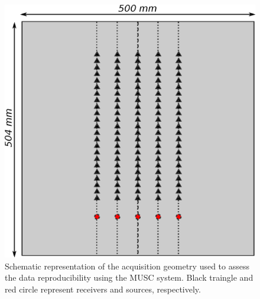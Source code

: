 \documentclass[manuscript,revised]{geophysics}
\begin{document}
\begin{figure}[!h]
	\centering
	\includegraphics[scale=0.5]{fig/reproducibility_acqui_principle.eps}
	\caption{Schematic representation of the acquisition geometry used to assess the data reproducibility using the MUSC system. Black traingle and red circle represent receivers and sources, respectively.}
	\label{reproducibility_acqui_principle}
\end{figure}
\end{document}
